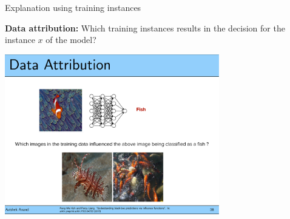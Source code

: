 \documentclass[11pt,compress,t,notes=noshow, aspectratio=169, xcolor=table]{beamer}
\begin{document}






\begin{frame}{Explanation using training instances~}

	\textbf{Data attribution:} Which training instances results in the decision for the instance $x$ of the model?
	\begin{center}
		\includegraphics[page=1, width=0.7\textwidth]{figure/fish-attribution.pdf}
	\end{center}
\end{frame}
\end{document}
